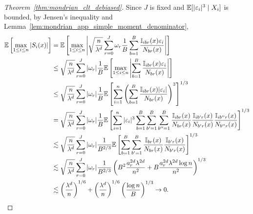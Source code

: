 \begin{proof}[Theorem~\ref{thm:mondrian_clt_debiased}]
  Since $J$ is fixed and
  $\mathbb{E}[|\varepsilon_i|^3 \mid X_i]$ is bounded,
  by Jensen's inequality and
  Lemma~\ref{lem:mondrian_app_simple_moment_denominator},
  \begin{align*}
    \mathbb{E}\left[\max_{1 \leq i \leq n} |S_i(x)| \right]
    &=
    \mathbb{E}\left[\max_{1 \leq i \leq n}
      \left|
      \sqrt{\frac{n}{\lambda^d}}
      \sum_{r=0}^{J}
      \omega_r
      \frac{1}{B} \sum_{b=1}^B
      \frac{\mathbb{I}_{i b r}(x) \varepsilon_i} {N_{b r}(x)}
      \right|
    \right] \\
    &\leq
    \sqrt{\frac{n}{\lambda^d}}
    \sum_{r=0}^{J}
    |\omega_r|
    \frac{1}{B}
    \mathbb{E}\left[\max_{1 \leq i \leq n}
      \left|
      \sum_{b=1}^B
      \frac{\mathbb{I}_{i b r}(x) \varepsilon_i} {N_{b r}(x)}
      \right|
    \right] \\
    &\leq
    \sqrt{\frac{n}{\lambda^d}}
    \sum_{r=0}^{J}
    |\omega_r|
    \frac{1}{B}
    \mathbb{E}\left[
      \sum_{i=1}^{n}
      \left(
        \sum_{b=1}^B
        \frac{\mathbb{I}_{i b r}(x) |\varepsilon_i|} {N_{b r}(x)}
      \right)^3
    \right]^{1/3} \\
    &=
    \sqrt{\frac{n}{\lambda^d}}
    \sum_{r=0}^{J}
    |\omega_r|
    \frac{1}{B}
    \mathbb{E}\left[
      \sum_{i=1}^{n}
      |\varepsilon_i|^3
      \sum_{b=1}^B
      \sum_{b'=1}^B
      \sum_{b''=1}^B
      \frac{\mathbb{I}_{i b r}(x) } {N_{b r}(x)}
      \frac{\mathbb{I}_{i b' r}(x) } {N_{b' r}(x)}
      \frac{\mathbb{I}_{i b'' r}(x) } {N_{b'' r}(x)}
    \right]^{1/3} \\
    &\lesssim
    \sqrt{\frac{n}{\lambda^d}}
    \sum_{r=0}^{J}
    |\omega_r|
    \frac{1}{B^{2/3}}
    \mathbb{E}\left[
      \sum_{b=1}^B
      \sum_{b'=1}^B
      \frac{\mathbb{I}_{b r}(x)} {N_{b r}(x)}
      \frac{\mathbb{I}_{b' r}(x)} {N_{b' r}(x)}
    \right]^{1/3} \\
    &\lesssim
    \sqrt{\frac{n}{\lambda^d}}
    \sum_{r=0}^{J}
    |\omega_r|
    \frac{1}{B^{2/3}}
    \left(
      B^2 \frac{a_r^{2d} \lambda^{2d}}{n^2}
      + B \frac{a_r^{2d} \lambda^{2d} \log n}{n^2}
    \right)^{1/3} \\
    &\lesssim
    \left( \frac{\lambda^d}{n} \right)^{1/6}
    + \left( \frac{\lambda^d}{n} \right)^{1/6}
    \left( \frac{\log n}{B} \right)^{1/3}
    \to 0.
  \end{align*}


\end{proof}
